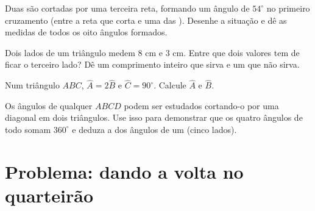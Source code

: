 \begin{exercise}[$\star\star$]\label{exo:g7:triangles:8}
Duas  são cortadas por uma terceira reta, formando um
ângulo de $54^\circ$ no primeiro cruzamento (entre a reta que corta e
uma das ). Desenhe a situação e dê as medidas de todos os oito
ângulos formados.
\end{exercise}

\begin{exercise}[$\star\star$]\label{exo:g7:triangles:9}
Dois lados de um triângulo medem $8$ cm e $3$ cm. Entre que dois
valores tem de ficar o terceiro lado? Dê um comprimento inteiro que
sirva e um que não sirva.
\end{exercise}

\begin{exercise}[$\star\star$]\label{exo:g7:triangles:10}
Num triângulo $ABC$, $\widehat A = 2\widehat B$ e
$\widehat C = 90^\circ$. Calcule $\widehat A$ e $\widehat B$.
\end{exercise}

\begin{exercise}[$\star\star\star$]\label{exo:g7:triangles:11}
Os ângulos de qualquer  $ABCD$ podem ser estudados
cortando-o por uma diagonal em dois triângulos. Use isso para
demonstrar que os quatro ângulos de todo  somam
$360^\circ$ e deduza a  dos ângulos de um  (cinco lados).
\end{exercise}

\section{Problema: dando a volta no quarteirão}

